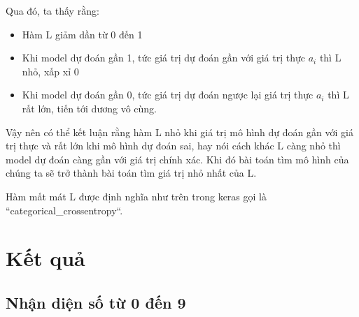 \documentclass[a4paper]{article}
\begin{document}
Qua đó, ta thấy rằng:

\begin{itemize}
    \item Hàm L giảm dần từ 0 đến 1
    \item Khi model dự đoán  
  gần 1, tức giá trị dự đoán gần với giá trị thực $a_i$ thì L nhỏ, xấp xỉ 0
  \item Khi model dự đoán  
  gần 0, tức giá trị dự đoán ngược lại giá trị thực $a_{i}$ 
  thì L rất lớn, tiến tới dương vô cùng.
\end{itemize}

Vậy nên có thể kết luận rằng hàm L nhỏ khi giá trị mô hình dự đoán gần với giá trị thực và rất lớn khi mô hình dự đoán sai, hay nói cách khác L càng nhỏ thì model dự đoán càng gần với giá trị chính xác. Khi đó  bài toán tìm mô hình của chúng ta sẽ trở thành bài toán tìm giá trị nhỏ nhất của L.

Hàm mất mát L được định nghĩa như trên trong keras gọi là “categorical\_crossentropy“.


\section{Kết quả}

\subsection{Nhận diện số từ 0 đến 9}
\end{document}
